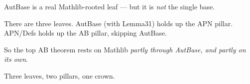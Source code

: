 \documentclass[11pt]{article}
\begin{document}
\textsf{AutBase} is a real Mathlib-rooted leaf --- but it is \emph{not} the
single base.

There are three leaves.
\textsf{AutBase} (with \textsf{Lemma31}) holds up the APN pillar.
\textsf{APN/Defs} holds up the AB pillar, skipping \textsf{AutBase}.

So the top AB theorem rests on Mathlib \emph{partly through AutBase, and partly
on its own}.

\bigskip
\begin{center}\small
Three leaves, two pillars, one crown.
\end{center}
\end{document}
